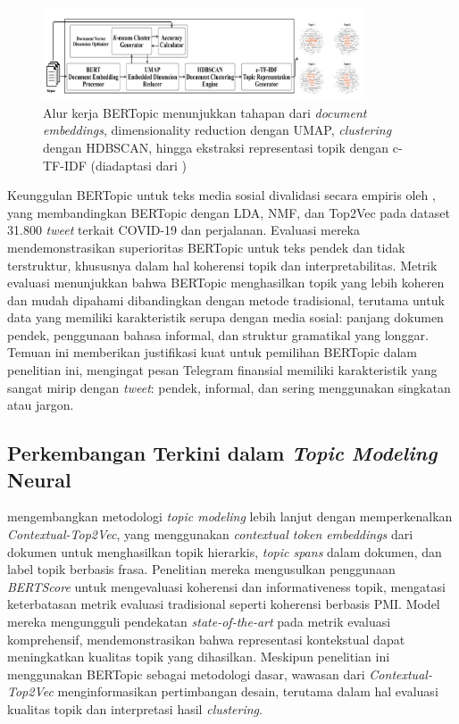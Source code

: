 \begin{figure}[H]
  \centering
  \includegraphics[width=0.85\textwidth]{image/bertopic-workflow.png}
  \caption{Alur kerja BERTopic menunjukkan tahapan dari \textit{document embeddings}, dimensionality reduction dengan UMAP, \textit{clustering} dengan HDBSCAN, hingga ekstraksi representasi topik dengan c-TF-IDF (diadaptasi dari \textcite{grootendorst2022})}
  \label{fig:bertopic-workflow}
\end{figure}

Keunggulan BERTopic untuk teks media sosial divalidasi secara empiris oleh \textcite{egger2022}, yang membandingkan BERTopic dengan LDA, NMF, dan Top2Vec pada dataset 31.800 \textit{tweet} terkait COVID-19 dan perjalanan. Evaluasi mereka mendemonstrasikan superioritas BERTopic untuk teks pendek dan tidak terstruktur, khususnya dalam hal koherensi topik dan interpretabilitas. Metrik evaluasi menunjukkan bahwa BERTopic menghasilkan topik yang lebih koheren dan mudah dipahami dibandingkan dengan metode tradisional, terutama untuk data yang memiliki karakteristik serupa dengan media sosial: panjang dokumen pendek, penggunaan bahasa informal, dan struktur gramatikal yang longgar. Temuan ini memberikan justifikasi kuat untuk pemilihan BERTopic dalam penelitian ini, mengingat pesan Telegram finansial memiliki karakteristik yang sangat mirip dengan \textit{tweet}: pendek, informal, dan sering menggunakan singkatan atau jargon.

\subsection{Perkembangan Terkini dalam \textit{Topic Modeling} Neural}

\textcite{angelov2024} mengembangkan metodologi \textit{topic modeling} lebih lanjut dengan memperkenalkan \textit{Contextual-Top2Vec}, yang menggunakan \textit{contextual token embeddings} dari dokumen untuk menghasilkan topik hierarkis, \textit{topic spans} dalam dokumen, dan label topik berbasis frasa. Penelitian mereka mengusulkan penggunaan \textit{BERTScore} untuk mengevaluasi koherensi dan informativeness topik, mengatasi keterbatasan metrik evaluasi tradisional seperti koherensi berbasis PMI. Model mereka mengungguli pendekatan \textit{state-of-the-art} pada metrik evaluasi komprehensif, mendemonstrasikan bahwa representasi kontekstual dapat meningkatkan kualitas topik yang dihasilkan. Meskipun penelitian ini menggunakan BERTopic sebagai metodologi dasar, wawasan dari \textit{Contextual-Top2Vec} menginformasikan pertimbangan desain, terutama dalam hal evaluasi kualitas topik dan interpretasi hasil \textit{clustering}.

